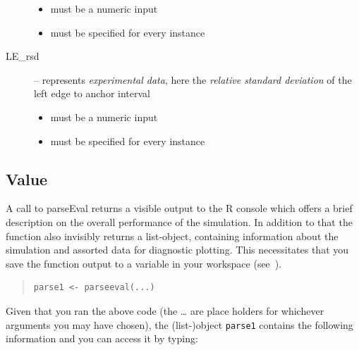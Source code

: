 \documentclass[
draft=false,
toc=graduated,
listof=totoc,
headsepline=true,
]%
{scrartcl}
\begin{document}
\begin{description}
\begin{itemize}
\item must be a numeric input
\item must be specified for every instance
\end{itemize}
\item[LE\_rsd] -- represents \emph{experimental data}, here the \emph{relative standard deviation} of the left edge to anchor interval
\begin{itemize}
\item must be a numeric input
\item must be specified for every instance
\end{itemize}
\end{description}
\subsection{Value}
A call to parseEval returns a visible output to the R console which offers a brief description on the overall performance of the simulation. In addition to that the function also invisibly returns a list-object, containing information about the simulation and assorted data for diagnostic plotting. This necessitates that you save the function output to a variable in your workspace (see~).
\begin{quote}
\begin{verbatim}
parse1 <- parseeval(...)
\end{verbatim}
\end{quote}
Given that you ran the above code (the \dots{} are place holders for whichever arguments you may have chosen), the (list-)object \texttt{parse1} contains the following information and you can access it by typing:
\end{document}
